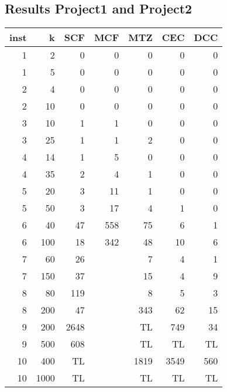 \documentclass[11pt]{article}
\begin{document}
\subsection{Results Project1 and Project2}
\begin{tabular}{rrrrrrr}
\toprule
  inst &     k &  SCF & MCF & MTZ & CEC & DCC \\
\midrule
     1 &     2 &            0 &             0 &             0 &             0 &             0 \\
     1 &     5 &            0 &             0 &             0 &             0 &             0 \\
     2 &     4 &            0 &             0 &             0 &             0 &             0 \\
     2 &    10 &            0 &             0 &             0 &             0 &             0 \\
     3 &    10 &            1 &             1 &             0 &             0 &             0 \\
     3 &    25 &            1 &             1 &             2 &             0 &             0 \\
     4 &    14 &            1 &             5 &             0 &             0 &             0 \\
     4 &    35 &            2 &             4 &             1 &             0 &             0 \\
     5 &    20 &            3 &            11 &             1 &             0 &             0 \\
     5 &    50 &            3 &            17 &             4 &             1 &             0 \\
     6 &    40 &           47 &           558 &            75 &             6 &             1 \\
     6 &   100 &           18 &           342 &            48 &            10 &             6 \\
     7 &    60 &           26 &               &              7 &             4 &             1\\ 
     7 &   150 &           37 &               &             15 &             4 &             9\\ 
     8 &    80 &          119 &               &              8 &             5 &             3\\ 
     8 &   200 &           47 &               &            343 &            62 &            15\\ 
     9 &   200 &         2648 &               &           TL &             749 &            34\\ 
     9 &   500 &          608 &               &           TL &            TL &              TL\\   
    10 &   400 &           TL &               &           1819 &          3549 &           560\\ 
    10 &  1000 &           TL &               &           TL &            TL &              TL\\   
\bottomrule
\end{tabular}







%
\newpage
 

\end{document}
